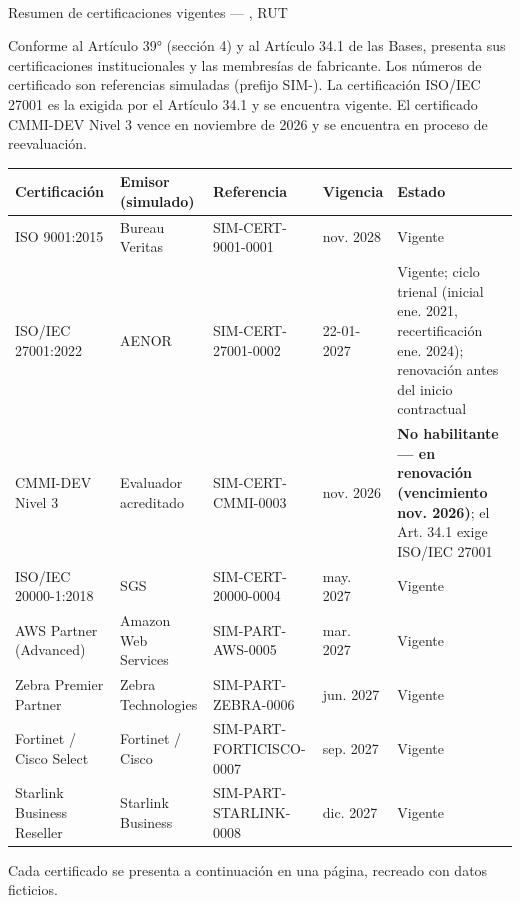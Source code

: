 \documentclass[11pt]{article}
\begin{document}
\renewcommand{\arraystretch}{1.2}
\\[2pt]
{\small Resumen de certificaciones vigentes --- \LFXempresa, RUT \LFXrut}\par\smallskip

\noindent Conforme al Artículo 39° (sección 4) y al Artículo 34.1 de las Bases, \LFXempresa{} presenta sus certificaciones institucionales y las membresías de fabricante. Los números de certificado son referencias simuladas (prefijo SIM-). La certificación ISO/IEC 27001 es la exigida por el Artículo 34.1 y se encuentra vigente. El certificado CMMI-DEV Nivel 3 vence en noviembre de 2026 y se encuentra en proceso de reevaluación.

\medskip\small
\noindent\begin{tabularx}{\linewidth}{@{}>{\raggedright\arraybackslash}p{2.7cm} >{\raggedright\arraybackslash}p{2.6cm} >{\raggedright\arraybackslash}p{3.1cm} p{1.5cm} X@{}}\toprule
  \textbf{Certificación} & \textbf{Emisor (simulado)} & \textbf{Referencia} & \textbf{Vigencia} & \textbf{Estado}\\\midrule
  ISO 9001:2015 & Bureau Veritas & SIM-CERT-9001-0001 & nov. 2028 & Vigente\\
  ISO/IEC 27001:2022 & AENOR & SIM-CERT-27001-0002 & 22-01-2027 & Vigente; ciclo trienal (inicial ene. 2021, recertificación ene. 2024); renovación antes del inicio contractual\\
  CMMI-DEV Nivel 3 & Evaluador acreditado & SIM-CERT-CMMI-0003 & nov. 2026 & \textbf{No habilitante --- en renovación (vencimiento nov. 2026)}; el Art. 34.1 exige ISO/IEC 27001\\
  ISO/IEC 20000-1:2018 & SGS & SIM-CERT-20000-0004 & may. 2027 & Vigente\\
  AWS Partner (Advanced) & Amazon Web Services & SIM-PART-AWS-0005 & mar. 2027 & Vigente\\
  Zebra Premier Partner & Zebra Technologies & SIM-PART-ZEBRA-0006 & jun. 2027 & Vigente\\
  Fortinet / Cisco Select & Fortinet / Cisco & SIM-PART-FORTICISCO-0007 & sep. 2027 & Vigente\\
  Starlink Business Reseller & Starlink Business & SIM-PART-STARLINK-0008 & dic. 2027 & Vigente\\\bottomrule
\end{tabularx}
\normalsize

\noindent Cada certificado se presenta a continuación en una página, recreado con datos ficticios.
\end{document}
